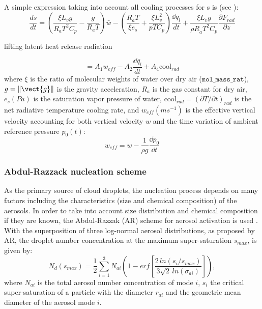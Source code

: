 A simple expression taking into account all cooling processes for s is (see
\cite{Zhang:2014}):
\begin{equation}
\frac{ds}{dt}=\left( \frac{\xi L_{v}g}{R_{a}T^{2}C_{p}}-\frac{g}{R_{a}T}
\right)\bar{w}-\left( \frac{R_{a}T}{\xi e_{s}}+\frac{\xi L_{v}^{2}}{pTC_{p}}
\right)\frac{\dd\bar{q_{l}}}{dt}+\frac{\xi L_{v}g}{{\rho
R}_{a}T^{2}C_{p}}\frac{\partial F_{rad}}{\partial z}
\end{equation}
\begin{center}
lifting \quad	\quad \quad \quad \quad \quad \quad \quad \quad latent	\quad heat \quad	release \quad	radiation
\end{center}
\begin{equation}
=A_{1}w_{eff}-A_{2}\frac{\dd\bar{q_{l}}}{dt}+A_{4}\text{cool}_{rad}
\end{equation}
where $\xi$ is the ratio of molecular weights of water over dry air
($\texttt{mol\_mass\_rat}$), $g = \|\vect{g}\|$ is the gravity acceleration,
$R_{a}$ is the gas constant for dry air, $e_{s} (\si{Pa})$ is the saturation
vapor pressure of water, $\text{cool}_{rad} = (\partial T/\partial t)_{rad}$
is the net radiative temperature cooling rate, and $w_{eff} (\si{m s^{-1}})$
is the effective vertical velocity accounting for both vertical velocity $w$
and the time variation of ambient reference pressure $p_0(t)$:
\begin{equation}
w_{eff} = w - \frac{1}{\rho g} \frac{\dd p_0}{\dd t}
\end{equation}

\subsubsection{Abdul-Razzack nucleation scheme}

As the primary source of cloud droplets, the nucleation process depends on
many factors including the characteristics (size and chemical composition)
of the aerosols. In order to take into account size distribution and
chemical composition if they are known, the Abdul-Razzak (AR) scheme
for aerosol activation is used \cite{Abdul-Razzak:2000}. With the superposition of three
log-normal aerosol distributions, as proposed by AR, the droplet number
concentration at the maximum super-saturation $s_{max}$, is given by:
\begin{equation}
N_{d}\left( s_{max} \right)=\frac{1}{2}\sum\limits_{i=1}^3 {N_{ai}\left(
1-erf\left[ \frac{2\, ln\left( s_{i}/s_{max} \right)}{3\sqrt {2\, } ln\left(
\sigma_{ai} \right)} \right] \right)} ,
\end{equation}
where $N_{ai} $ is the total aerosol number concentration of mode $i$,
$s_{i}$ the critical super-saturation of a particle with the diameter $r_{ai}$ and
the geometric mean diameter of the aerosol mode $i$.

